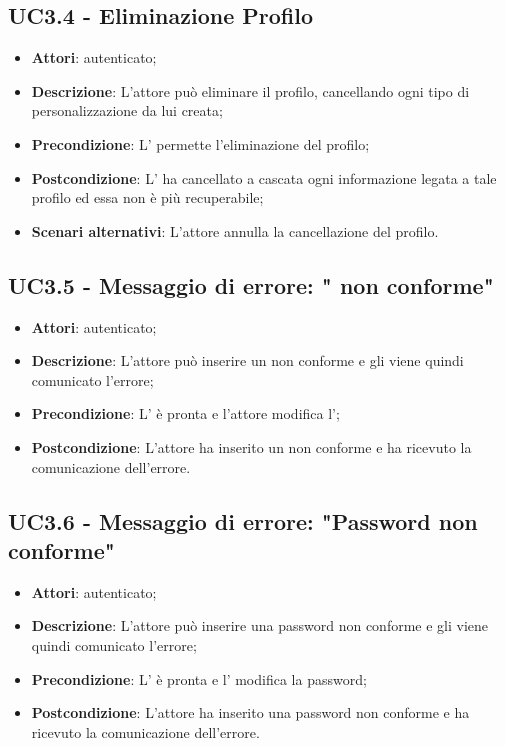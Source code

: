 \subsection{UC3.4 - Eliminazione Profilo}
\label{ssec:UC3.4}
\begin{itemize}
\item \textbf{Attori}:  autenticato;
\item \textbf{Descrizione}: L'attore può eliminare il profilo, cancellando ogni tipo di personalizzazione da lui creata;
\item \textbf{Precondizione}: L' permette l'eliminazione del profilo;
\item \textbf{Postcondizione}: L' ha cancellato a cascata ogni informazione legata a tale profilo ed essa non è più recuperabile;
\item \textbf{Scenari alternativi}: L'attore annulla la cancellazione del profilo.
\end{itemize}
\subsection{UC3.5 - Messaggio di errore: " non conforme"}
\label{ssec:UC3.5}
\begin{itemize}
\item \textbf{Attori}:  autenticato;
\item \textbf{Descrizione}: L'attore può inserire un  non conforme e gli viene quindi comunicato l'errore;
\item \textbf{Precondizione}: L' è pronta e l'attore modifica l';
\item \textbf{Postcondizione}: L'attore ha inserito un  non conforme e ha ricevuto la comunicazione dell'errore.
\end{itemize}
\subsection{UC3.6 - Messaggio di errore: "Password non conforme"}
\label{ssec:UC3.6}
\begin{itemize}
\item \textbf{Attori}:  autenticato;
\item \textbf{Descrizione}: L'attore può inserire una password non conforme e gli viene quindi comunicato l'errore;
\item \textbf{Precondizione}: L' è pronta e l' modifica la password;
\item \textbf{Postcondizione}: L'attore ha inserito una password non conforme e ha ricevuto la comunicazione dell'errore.
\end{itemize}
